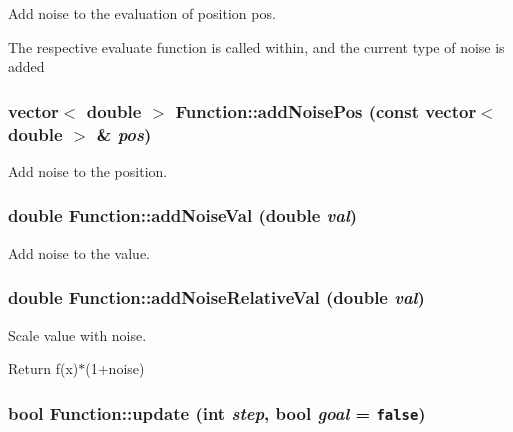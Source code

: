 Add noise to the evaluation of position pos. 

The respective evaluate function is called within, and the current type of noise is added \hypertarget{classFunction_af172a6b18b99aeeccdc22d408a5fc29}{
\subsubsection{\setlength{\rightskip}{0pt plus 5cm}vector$<$ double $>$ Function::addNoisePos (const vector$<$ double $>$ \& {\em pos})}}
\label{classFunction_af172a6b18b99aeeccdc22d408a5fc29}


Add noise to the position. 

\hypertarget{classFunction_ecbc9e3a5181a8ba35af8c60a3b28c11}{
\subsubsection{\setlength{\rightskip}{0pt plus 5cm}double Function::addNoiseVal (double {\em val})}}
\label{classFunction_ecbc9e3a5181a8ba35af8c60a3b28c11}


Add noise to the value. 

\hypertarget{classFunction_f19cf9d966785fd17c0c0b94d5483d99}{
\subsubsection{\setlength{\rightskip}{0pt plus 5cm}double Function::addNoiseRelativeVal (double {\em val})}}
\label{classFunction_f19cf9d966785fd17c0c0b94d5483d99}


Scale value with noise. 

Return f(x)$\ast$(1+noise) \hypertarget{classFunction_31bae656cf84683529a1a8c19c9f0a67}{
\subsubsection{\setlength{\rightskip}{0pt plus 5cm}bool Function::update (int {\em step}, \/  bool {\em goal} = {\tt false})}}
\label{classFunction_31bae656cf84683529a1a8c19c9f0a67}


